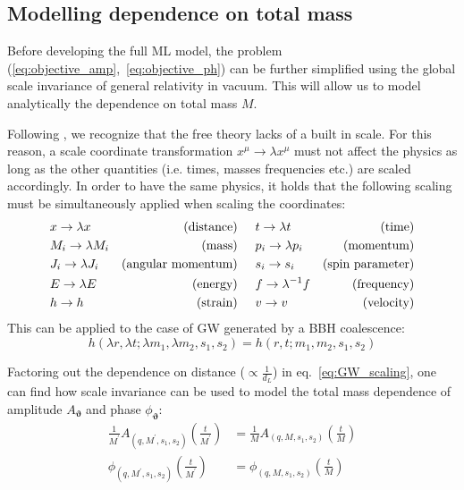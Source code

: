 \subsection{Modelling dependence on total mass}
Before developing the full ML model, the problem (\ref{eq:objective_amp},~\ref{eq:objective_ph}) can be further simplified using the global scale invariance of general relativity in vacuum. This will allow us to model analytically the dependence on total mass $M$.
\par
Following \cite{Arbey2019scaling}, we recognize that the free theory lacks of a built in scale. For this reason, a scale coordinate transformation $x^\mu \rightarrow \lambda x^\mu$ must not affect the physics as long as the other quantities (i.e. times, masses frequencies etc.) are scaled accordingly.
In order to have the same physics, it holds that the following scaling must be simultaneously applied when scaling the coordinates:
{\footnotesize
\begin{alignat*}{4}
	&x \rightarrow \lambda x & \textrm{(distance)} \hskip0.5cm &t \rightarrow \lambda t & \textrm{(time)}\\
	&M_i \rightarrow \lambda M_i & \textrm{(mass)} \hskip0.5cm &p_i \rightarrow \lambda p_i & \textrm{(momentum)} \\
	&J_i \rightarrow \lambda J_i  & \textrm{(angular momentum)} \hskip0.5cm &s_i \rightarrow s_i & \textrm{(spin parameter)}\\
	&E \rightarrow \lambda E & \textrm{(energy)} \hskip0.5cm &f \rightarrow \lambda^{-1} f & \textrm{(frequency)}\\
	&h \rightarrow h & \textrm{(strain)} \hskip0.5cm &v \rightarrow v & \textrm{(velocity)} \\
\end{alignat*}
}
This can be applied to the case of GW generated by a BBH coalescence:
\begin{equation}\label{eq:GW_scaling}
	h(\lambda r,\lambda t; \lambda m_1, \lambda m_2, s_1, s_2) = h(r, t; m_1, m_2, s_1, s_2)
\end{equation}
\par
Factoring out the dependence on distance ($\propto \frac{1}{d_L}$) in eq.~\eqref{eq:GW_scaling}, one can find how scale invariance can be used to model the total mass dependence of amplitude $A_{\boldsymbol{\vartheta}}$ and phase ${\phi}_{\boldsymbol{\vartheta}}$:
\begin{align}
	\frac{1}{M^\prime} A_{(q, M^\prime, s_1, s_2)}\left(\frac{t}{M^\prime}\right) &= 	\frac{1}{M} A_{(q, M, s_1, s_2)}\left(\frac{t}{M}\right) \label{eq:amp_scaling}\\
	{\phi}_{(q, M^\prime, s_1, s_2)}\left(\frac{t}{M^\prime}\right) &= 	{\phi}_{(q, M, s_1, s_2)}\left(\frac{t}{M}\right)  \label{eq:ph_scaling}
\end{align}
